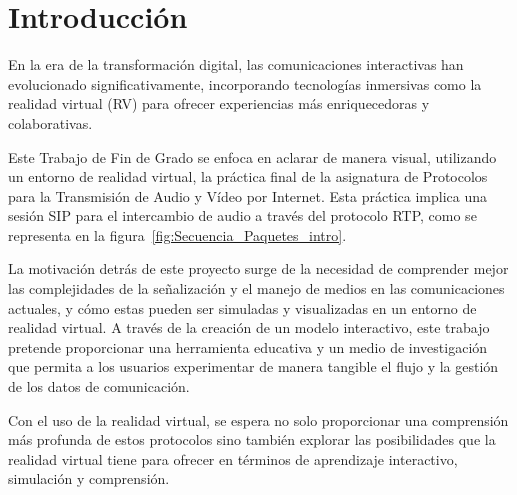\documentclass[a4paper, 12pt]{book}
\begin{document}

\cleardoublepage
\chapter{Introducción}
\label{sec:intro} %
En la era de la transformación digital, las comunicaciones interactivas han evolucionado significativamente, 
incorporando tecnologías inmersivas como la realidad virtual (RV) para ofrecer experiencias más enriquecedoras y colaborativas. 

\bigskip

Este Trabajo de Fin de Grado se enfoca en aclarar de manera visual, utilizando un entorno de realidad virtual, la práctica final 
de la asignatura de Protocolos para la Transmisión de Audio y Vídeo por Internet. Esta práctica implica una sesión SIP para el 
intercambio de audio a través del protocolo RTP, como se representa en la figura~\ref{fig:Secuencia_Paquetes_intro}.

\bigskip

La motivación detrás de este proyecto surge de la necesidad de comprender mejor las complejidades de la señalización y 
el manejo de medios en las comunicaciones actuales, y cómo estas pueden ser simuladas y visualizadas en un entorno de realidad virtual. 
A través de la creación de un modelo interactivo, este trabajo pretende proporcionar una herramienta educativa y un medio de 
investigación que permita a los usuarios experimentar de manera tangible el flujo y la gestión de los datos de comunicación.

\bigskip

Con el uso de la realidad virtual, se espera no solo proporcionar una comprensión más profunda de estos protocolos sino también explorar 
las posibilidades que la realidad virtual tiene para ofrecer en términos de aprendizaje interactivo, simulación y comprensión.
\end{document}
